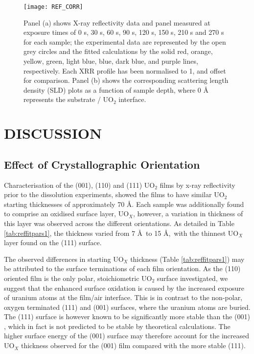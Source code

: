 \documentclass[twocolumn,prl,nobalancelastpage,aps,10pt]{revtex4-1}
\begin{document}
\begin{figure*}
	\centering
	\texttt{[image: REF\_CORR]}
	\caption{Panel (a) shows X-ray reflectivity data and panel measured at exposure times of 0 s, 30 s, 60 s, 90 s, 120 s, 150 s, 210 s and 270 s for each sample; the experimental data are represented by the open grey circles and the fitted calculations by the solid red, orange, yellow, green, light blue, blue, dark blue, and purple lines, respectively. Each XRR profile has been normalised to 1, and offset for comparison. Panel (b) shows the corresponding scattering length density (SLD) plots as a function of sample depth,  where 0 \AA\, represents the substrate / UO$_2$ interface.}
	\label{fig:corrodedxrr2}
\end{figure*}

\section{DISCUSSION}
\subsection{Effect of Crystallographic Orientation }
Characterisation of the (001), (110) and (111) UO$_2$ films by x-ray reflectivity prior to the dissolution experiments, showed the films to have similar UO$_2$ starting thicknesses of approximately 70 \AA. Each sample was additionally found to comprise an oxidised surface layer, UO$_X$, however, a variation in thickness of this layer was observed across the different orientations. As detailed in Table \ref{tab:reffitpars1}, the thickness varied from 7 \AA\, to 15 \AA,\, with the thinnest UO$_X$ layer found on the (111) surface.

The observed differences in starting UO$_X$ thickness (Table \ref{tab:reffitpars1}) may be attributed to the surface terminations of each film orientation.
As the (110) oriented film is the only polar, stoichiometric UO$_2$ surface investigated, we suggest that the enhanced surface oxidation is caused by the increased exposure of uranium atoms at the film/air interface. This is in contrast to the non-polar, oxygen terminated (111) and (001) surfaces, where the uranium atoms are buried. The (111) surface is however known to be significantly more stable than the (001) \cite{Bottin2016}, which in fact is not predicted to be stable by theoretical calculations. The higher surface energy of the (001) surface may therefore account for the increased UO$_X$ thickness observed for the (001) film compared with the more stable (111).
\end{document}
